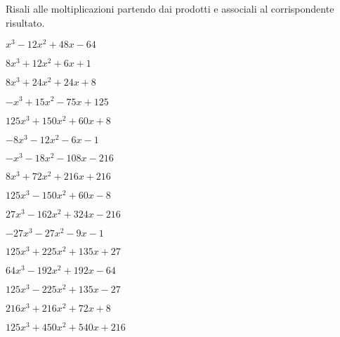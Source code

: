 \begin{esercizio}
\label{ese:11.11}
Risali alle moltiplicazioni partendo dai prodotti e associali al 
corrispondente risultato.

\begin{htmulticols}{2}
\begin{enumeratea}
\spazielenx
\item \(x^{3} - 12 x^{2} + 48 x - 64\) %
\item \(8 x^{3} + 12 x^{2} + 6 x + 1\) %
\item \(8 x^{3} + 24 x^{2} + 24 x + 8\) %
\item \(- x^{3} + 15 x^{2} - 75 x + 125\) %
\item \(125 x^{3} + 150 x^{2} + 60 x + 8\) %
\item \(- 8 x^{3} - 12 x^{2} - 6 x - 1\) %
\item \(- x^{3} - 18 x^{2} - 108 x - 216\) %
\item \(8 x^{3} + 72 x^{2} + 216 x + 216\) %
\item \(125 x^{3} - 150 x^{2} + 60 x - 8\) %
\item \(27 x^{3} - 162 x^{2} + 324 x - 216\)  %
\item \(- 27 x^{3} - 27 x^{2} - 9 x - 1\) %
\item \(125 x^{3} + 225 x^{2} + 135 x + 27\) %
\item \(64 x^{3} - 192 x^{2} + 192 x - 64\) %
\item \(125 x^{3} - 225 x^{2} + 135 x - 27\) %
\item \(216 x^{3} + 216 x^{2} + 72 x + 8\) %
\item \(125 x^{3} + 450 x^{2} + 540 x + 216\) %


\end{enumeratea}
\end{htmulticols}
\end{esercizio}
